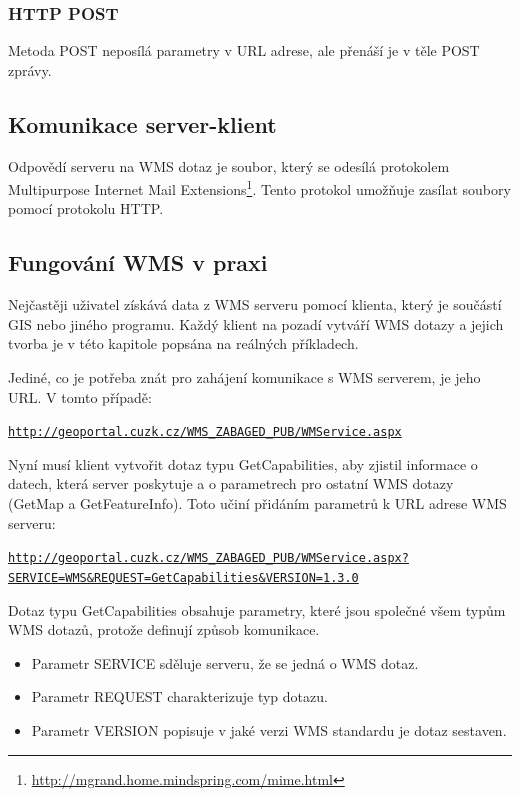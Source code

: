 \documentclass[a4paper,12pt]{article}
\begin{document}
\subsubsection{HTTP POST}

Metoda POST neposílá parametry v URL adrese, ale přenáší je v těle POST zprávy.


\subsection{Komunikace server-klient}

Odpovědí serveru na WMS dotaz je soubor, který se odesílá protokolem Multipurpose Internet Mail Extensions\footnote{\url{http://mgrand.home.mindspring.com/mime.html}}. Tento protokol umožňuje zasílat soubory pomocí protokolu HTTP.


\subsection{Fungování WMS v praxi}

 
Nejčastěji uživatel získává data z WMS serveru pomocí klienta, který je součástí GIS nebo jiného programu. Každý klient na pozadí vytváří WMS dotazy a jejich 
tvorba je v této kapitole popsána na reálných příkladech. 


\newpage
Jediné, co je potřeba znát pro zahájení komunikace s WMS serverem, je jeho URL. V tomto případě:
\begin{alltt}\footnotesize
\url{http://geoportal.cuzk.cz/WMS_ZABAGED_PUB/WMService.aspx}
\end{alltt}

Nyní musí klient vytvořit dotaz typu GetCapabilities, aby zjistil informace o datech, která server poskytuje a o parametrech pro ostatní WMS dotazy (GetMap a GetFeatureInfo).
Toto učiní přidáním parametrů k URL adrese WMS serveru:

\newcommand{\CUZKgetCap}{http://geoportal.cuzk.cz/WMS_ZABAGED_PUB/WMService.aspx?SERVICE=WMS&REQUEST=GetCapabilities&VERSION=1.3.0}
\begin{alltt}\footnotesize
\href{\CUZKgetCap}{http://geoportal.cuzk.cz/WMS_ZABAGED_PUB/WMService.aspx?}
\href{\CUZKgetCap}{SERVICE=WMS&REQUEST=GetCapabilities&VERSION=1.3.0}
\end{alltt}

 Dotaz typu GetCapabilities obsahuje parametry, které jsou společné všem typům WMS dotazů, protože definují způsob komunikace.
\begin{itemize}
  \item Parametr SERVICE sděluje serveru, že se jedná o WMS dotaz. 
  \item Parametr REQUEST charakterizuje typ dotazu. 
  \item Parametr VERSION popisuje v jaké verzi WMS standardu je dotaz sestaven.
\end{itemize}
\end{document}
